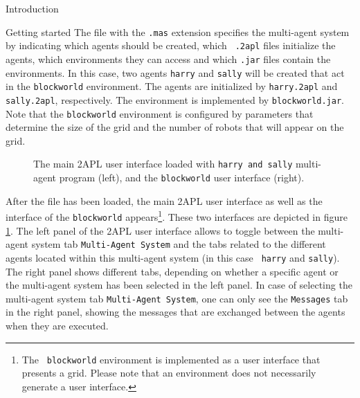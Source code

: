 \begin{chapter}{Introduction}
\begin{section}{Getting started}
The file with the {\tt .mas} extension specifies the multi-agent
system by indicating which agents should be created, which {\tt
.2apl} files initialize the agents, which environments they can
access and which {\tt .jar} files contain the environments. In this
case, two agents {\tt harry} and {\tt sally} will be created that
act in the {\tt blockworld} environment. The agents are initialized
by {\tt harry.2apl} and {\tt sally.2apl}, respectively. The
environment is implemented by {\tt blockworld.jar}. Note that the
{\tt blockworld} environment is configured by parameters that
determine the size of the grid and the number of robots that will
appear on the grid.

\begin{figure}
    \begin{minipage}{0.6\linewidth}
        \begin{center}
        \end{center}
    \end{minipage}
    \hspace{.5cm}
    \begin{minipage}{0.3\linewidth}
        \begin{center}
        \end{center}
    \end{minipage}
    \caption{The main 2APL user interface loaded with {\tt harry and sally} multi-agent program (left), and the {\tt blockworld} user interface (right).}\label{fig:loadedmas}
\end{figure}

After the file has been loaded, the main 2APL user interface as well
as the interface of the {\tt blockworld} appears\footnote{The {\tt
blockworld} environment is implemented as a user interface that
presents a grid. Please note that an environment does not
necessarily generate a user interface.}. These two interfaces are
depicted in figure \ref{fig:loadedmas}. The left panel of the 2APL
user interface allows to toggle between the multi-agent system tab
{\tt Multi-Agent System} and the tabs related to the different
agents located within this multi-agent system (in this case {\tt
harry} and {\tt sally}). The right panel shows different tabs,
depending on whether a specific agent or the multi-agent system has
been selected in the left panel. In case of selecting the
multi-agent system tab {\tt Multi-Agent System}, one can only see
the {\tt Messages} tab in the right panel, showing the messages that
are exchanged between the agents when they are executed.


\end{section}
\end{chapter}
